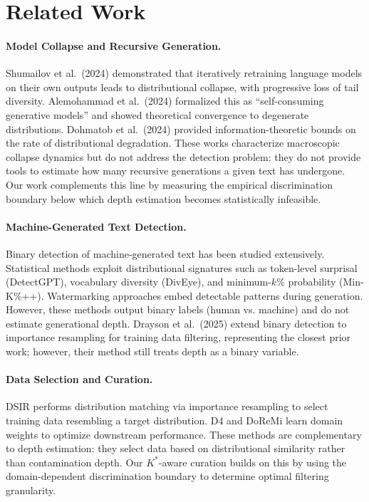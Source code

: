 \documentclass[11pt,a4paper]{article}
\begin{document}
\section{Related Work}

\paragraph{Model Collapse and Recursive Generation.}
Shumailov et al.~(2024) demonstrated that iteratively retraining language models on their own outputs leads to distributional collapse, with progressive loss of tail diversity. Alemohammad et al.~(2024) formalized this as ``self-consuming generative models'' and showed theoretical convergence to degenerate distributions. Dohmatob et al.~(2024) provided information-theoretic bounds on the rate of distributional degradation. These works characterize macroscopic collapse dynamics but do not address the detection problem: they do not provide tools to estimate how many recursive generations a given text has undergone. Our work complements this line by measuring the empirical discrimination boundary below which depth estimation becomes statistically infeasible.

\paragraph{Machine-Generated Text Detection.}
Binary detection of machine-generated text has been studied extensively. Statistical methods exploit distributional signatures such as token-level surprisal (DetectGPT), vocabulary diversity (DivEye), and minimum-$k$\% probability (Min-K\%++). Watermarking approaches embed detectable patterns during generation. However, these methods output binary labels (human vs. machine) and do not estimate generational depth. Drayson et al.~(2025) extend binary detection to importance resampling for training data filtering, representing the closest prior work; however, their method still treats depth as a binary variable.

\paragraph{Data Selection and Curation.}
DSIR performs distribution matching via importance resampling to select training data resembling a target distribution. D4 and DoReMi learn domain weights to optimize downstream performance. These methods are complementary to depth estimation: they select data based on distributional similarity rather than contamination depth. Our $K^*$-aware curation builds on this by using the domain-dependent discrimination boundary to determine optimal filtering granularity.
\end{document}
